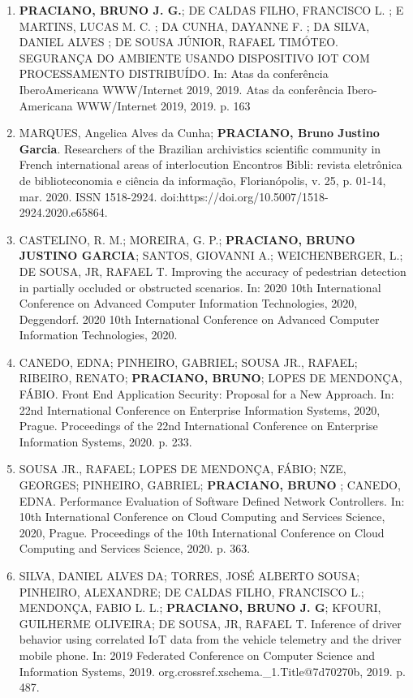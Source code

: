 \begin{enumerate}

\item \textbf{PRACIANO, BRUNO J. G.}; DE CALDAS FILHO, FRANCISCO L. ; E MARTINS, LUCAS M. C. ; DA CUNHA, DAYANNE F. ; DA SILVA, DANIEL ALVES ; DE SOUSA JÚNIOR, RAFAEL TIMÓTEO. SEGURANÇA DO AMBIENTE USANDO DISPOSITIVO IOT COM PROCESSAMENTO DISTRIBUÍDO. In: Atas da conferência IberoAmericana WWW/Internet 2019, 2019. Atas da conferência Ibero-Americana WWW/Internet 2019, 2019. p. 163

\item MARQUES, Angelica Alves da Cunha; \textbf{PRACIANO, Bruno Justino Garcia}. Researchers of the Brazilian archivistics scientific community in French international areas of interlocution Encontros Bibli: revista eletrônica de biblioteconomia e ciência da informação, Florianópolis, v. 25, p. 01-14, mar. 2020. ISSN 1518-2924. doi:https://doi.org/10.5007/1518-2924.2020.e65864.

\item CASTELINO, R. M.; MOREIRA, G. P.; \textbf{PRACIANO, BRUNO JUSTINO GARCIA}; SANTOS, GIOVANNI A.; WEICHENBERGER, L.; DE SOUSA, JR, RAFAEL T. Improving the accuracy of pedestrian detection in partially occluded or obstructed scenarios. In: 2020 10th International Conference on Advanced Computer Information Technologies, 2020, Deggendorf. 2020 10th International Conference on Advanced Computer Information Technologies, 2020.

\item CANEDO, EDNA; PINHEIRO, GABRIEL; SOUSA JR., RAFAEL; RIBEIRO, RENATO; \textbf{PRACIANO, BRUNO}; LOPES DE MENDONÇA, FÁBIO. Front End Application Security: Proposal for a New Approach. In: 22nd International Conference on Enterprise Information Systems, 2020, Prague. Proceedings of the 22nd International Conference on Enterprise Information Systems, 2020. p. 233.

\item SOUSA JR., RAFAEL; LOPES DE MENDONÇA, FÁBIO; NZE, GEORGES; PINHEIRO, GABRIEL; \textbf{PRACIANO, BRUNO }; CANEDO, EDNA. Performance Evaluation of Software Defined Network Controllers. In: 10th International Conference on Cloud Computing and Services Science, 2020, Prague. Proceedings of the 10th International Conference on Cloud Computing and Services Science, 2020. p. 363.


\item SILVA, DANIEL ALVES DA; TORRES, JOSÉ ALBERTO SOUSA; PINHEIRO, ALEXANDRE; DE CALDAS FILHO, FRANCISCO L.; MENDONÇA, FABIO L. L.; \textbf{PRACIANO, BRUNO J. G}; KFOURI, GUILHERME OLIVEIRA; DE SOUSA, JR, RAFAEL T. Inference of driver behavior using correlated IoT data from the vehicle telemetry and the driver mobile phone. In: 2019 Federated Conference on Computer Science and Information Systems, 2019. org.crossref.xschema.\_1.Title@7d70270b, 2019. p. 487.


\end{enumerate}
